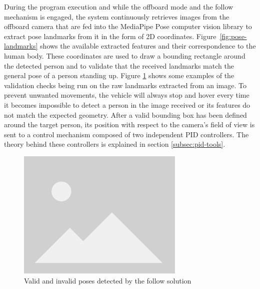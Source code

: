 During the program execution and while the offboard mode and the follow mechanism is engaged, the system continuously retrieves images from the offboard camera that are fed into the MediaPipe Pose \cite{mp-pose-paper} computer vision library to extract pose landmarks from it in the form of 2D coordinates.
Figure~\ref{fig:pose-landmarks} shows the available extracted features and their correspondence to the human body.
These coordinates are used to draw a bounding rectangle around the detected person and to validate that the received landmarks match the general pose of a person standing up.
Figure \ref{fig:pose-validation} shows some examples of the validation checks being run on the raw landmarks extracted from an image.
To prevent unwanted movements, the vehicle will always stop and hover every time it becomes impossible to detect a person in the image received or its features do not match the expected geometry.
After a valid bounding box has been defined around the target person, its position with respect to the camera's field of view is sent to a control mechanism composed of two independent PID controllers. The theory behind these controllers is explained in section \ref{subsec:pid-tools}.

\begin{figure}
  \centering
  \includegraphics[width=8cm, keepaspectratio]{img/placeholder.png}
  \caption{Valid and invalid poses detected by the follow solution}
  \label{fig:pose-validation}
\end{figure}

